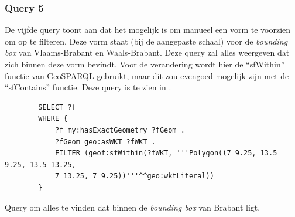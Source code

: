 \subsubsection{Query 5}
De vijfde query toont aan dat het mogelijk is om manueel een vorm te voorzien om op te filteren. Deze vorm staat (bij de aangepaste schaal) voor de \textit{bounding box} van Vlaams-Brabant en Waals-Brabant. Deze query zal alles weergeven dat zich binnen deze vorm bevindt. Voor de verandering wordt hier de ``sfWithin'' functie van GeoSPARQL gebruikt, maar dit zou evengoed mogelijk zijn met de ``sfContains'' functie. Deze query is te zien in .

\begin{listing}[ht]
    \begin{verbatim}
        SELECT ?f
        WHERE {
            ?f my:hasExactGeometry ?fGeom .
            ?fGeom geo:asWKT ?fWKT .
            FILTER (geof:sfWithin(?fWKT, '''Polygon((7 9.25, 13.5 9.25, 13.5 13.25, 
            7 13.25, 7 9.25))'''^^geo:wktLiteral))
        }
    \end{verbatim}
    \caption{Query om alles te vinden dat binnen de \textit{bounding box} van Brabant ligt.}
    \label{listing:find_everything_bounding_box}
\end{listing}
